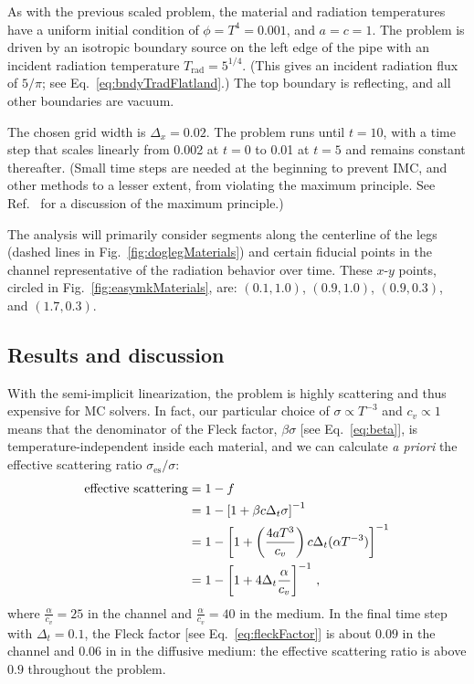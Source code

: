 As with the previous scaled problem, the material and radiation temperatures
have a uniform initial condition of $\phi = T^4 = 0.001$, and $a=c=1$. The
problem is driven by an isotropic boundary source on the left edge of the pipe
with an incident radiation temperature $T_\text{rad} = 5^{1/4}$. (This gives
an incident radiation flux of $5/\pi$; see Eq.~\eqref{eq:bndyTradFlatland}.)
The top boundary is reflecting, and all other boundaries are vacuum.

The chosen grid width is $\Delta_x = 0.02$. The problem runs until $t=10$, with
a time step that scales linearly from 0.002 at $t=0$ to 0.01 at $t=5$ and
remains constant thereafter. (Small time steps are needed at the beginning to
prevent IMC, and other methods to a lesser extent, from violating the maximum
principle. See Ref.~\cite{Lar1987} for a discussion of the maximum principle.)

The analysis will primarily consider segments along the centerline of the legs
(dashed lines
in Fig.~\ref{fig:doglegMaterials}) and certain fiducial points in the channel
representative of the radiation behavior over time. These $x$-$y$ points,
circled in Fig.~\ref{fig:easymkMaterials}, are: $(0.1, 1.0)$, $(0.9, 1.0)$,
$(0.9, 0.3)$, and $(1.7, 0.3)$.

\subsection{Results and discussion}

With the semi-implicit linearization, the problem is highly scattering and
thus expensive for MC solvers. In fact, our particular choice of $\sigma
\propto T^{-3}$ and $c_v \propto 1$ means that the denominator of the Fleck
factor, $\beta \sigma$ [see Eq.~\eqref{eq:beta}], is
temperature-independent inside each material, and we can calculate \emph{a
priori} the effective scattering ratio $\sigma_\text{es}/\sigma$:
\begin{align*}
  \text{effective scattering} &= 1 - f
  \\
  &= 1 - \left[ 1 + \beta c \Delta_t \sigma \right]^{-1}
  \\
  &= 1 -  \left[ 1 +\left(  \frac{4 a T^3}{ c_v } \right) c \Delta_t (\alpha T^{-3}) \right]^{-1}
  \\
  &= 1 - \left[ 1 + 4 \Delta_t \frac{\alpha}{c_v} \right]^{-1}\,,
\end{align*}
where $\frac{\alpha}{c_v} = 25$ in the channel and $\frac{\alpha}{c_v} = 40$ in
the medium. In the final time step with $\Delta_t=0.1$, the Fleck factor [see
Eq.~\eqref{eq:fleckFactor}] is about $0.09$ in the channel and $0.06$ in in the
diffusive medium: the effective scattering ratio is above $0.9$ throughout the
problem.

